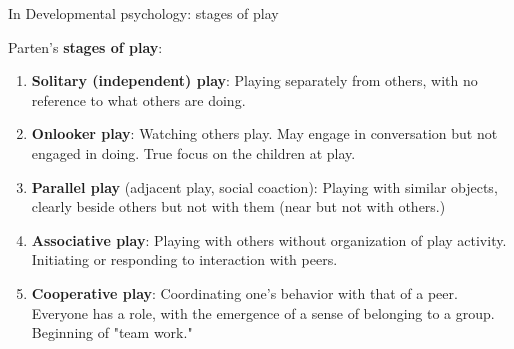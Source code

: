 \documentclass[handout,compress]{beamer}
\begin{document}
{
\begin{frame}{In Developmental psychology: stages of play}

    Parten's {\bf stages of play}:

    \begin{enumerate}
        \item<1-> {\bf Solitary (independent) play}: Playing separately from
            others, with no reference to what others are doing.
        \item<2-> {\bf Onlooker play}: Watching others play. May engage in
            conversation but not engaged in doing. True focus on the children at
            play.
        \item<3-> {\bf Parallel play} (adjacent play, social coaction): Playing
            with similar objects, clearly beside others but not with them (near
            but not with others.)
        \item<4-> {\bf Associative play}:  Playing with others without
            organization of play activity. Initiating or responding to
            interaction with peers. 
        \item<5-> {\bf Cooperative play}: Coordinating one’s behavior with that
            of a peer. Everyone has a role, with the emergence of a sense of
            belonging to a group. Beginning of "team work."
    \end{enumerate}

\end{frame}
}

\end{document}
